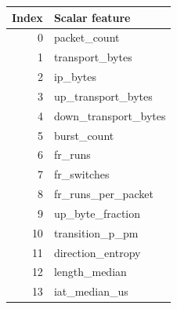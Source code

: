 \begin{tabular}{rl}
\toprule
Index & Scalar feature \\
\midrule
0 & packet\_count \\
1 & transport\_bytes \\
2 & ip\_bytes \\
3 & up\_transport\_bytes \\
4 & down\_transport\_bytes \\
5 & burst\_count \\
6 & fr\_runs \\
7 & fr\_switches \\
8 & fr\_runs\_per\_packet \\
9 & up\_byte\_fraction \\
10 & transition\_p\_pm \\
11 & direction\_entropy \\
12 & length\_median \\
13 & iat\_median\_us \\
\bottomrule
\end{tabular}
